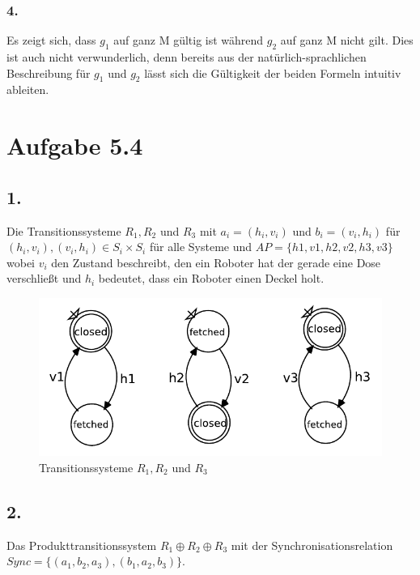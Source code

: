 \documentclass[12pt, paper=a4]{article}
\begin{document}
\newpage
\subsubsection*{4.}
Es zeigt sich, dass $g_{1}$ auf ganz M gültig ist während $g_{2}$ auf ganz M nicht gilt.
Dies ist auch nicht verwunderlich, denn bereits aus der natürlich-sprachlichen Beschreibung für $g_{1}$ und $g_{2}$ lässt sich die Gültigkeit der beiden Formeln intuitiv ableiten.

\section*{Aufgabe 5.4}
\subsection*{1.}
Die Transitionssysteme $R_1, R_2$ und $R_3$ mit $a_i = (h_i, v_i)$ und $b_i = (v_i, h_i)$ für $(h_i, v_i), (v_i, h_i) \in S_i \times S_i$ für alle Systeme und $AP = \{h1, v1, h2, v2, h3, v3\}$ wobei $v_i$ den Zustand beschreibt, den ein Roboter hat der gerade eine Dose verschließt und $h_i$ bedeutet, dass ein Roboter einen Deckel holt.\\

\begin{figure}[h!]
\centering
\includegraphics[scale=0.8]{r1r2r3.pdf}
\caption{Transitionssysteme $R_1, R_2$ und $R_3$}
\end{figure}

\subsection*{2.}
Das Produkttransitionssystem $R_1 \oplus R_2 \oplus R_3$ mit der Synchronisationsrelation $Sync = \{(a_1, b_2, a_3), (b_1, a_2, b_3)\}$.\\
\end{document}

